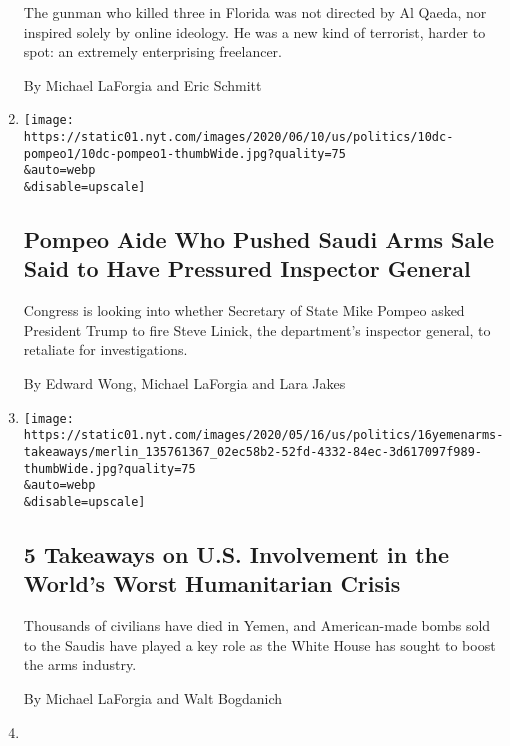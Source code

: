\begin{enumerate}
  The gunman who killed three in Florida was not directed by Al Qaeda,
  nor inspired solely by online ideology. He was a new kind of
  terrorist, harder to spot: an extremely enterprising freelancer.

  By Michael LaForgia and Eric Schmitt
\item
  \href{/2020/06/10/us/politics/pompeo-inspector-general-saudi-arms.html}{}

  \texttt{[image: https://static01.nyt.com/images/2020/06/10/us/politics/10dc-pompeo1/10dc-pompeo1-thumbWide.jpg?quality=75\\\&auto=webp\\\&disable=upscale]}

  \hypertarget{pompeo-aide-who-pushed-saudi-arms-sale-said-to-have-pressured-inspector-general}{%
  \subsection{Pompeo Aide Who Pushed Saudi Arms Sale Said to Have
  Pressured Inspector
  General}\label{pompeo-aide-who-pushed-saudi-arms-sale-said-to-have-pressured-inspector-general}}

  Congress is looking into whether Secretary of State Mike Pompeo asked
  President Trump to fire Steve Linick, the department's inspector
  general, to retaliate for investigations.

  By Edward Wong, Michael LaForgia and Lara Jakes
\item
  \href{/2020/05/16/us/arms-deals-yemen.html}{}

  \texttt{[image: https://static01.nyt.com/images/2020/05/16/us/politics/16yemenarms-takeaways/merlin\_135761367\_02ec58b2-52fd-4332-84ec-3d617097f989-thumbWide.jpg?quality=75\\\&auto=webp\\\&disable=upscale]}

  \hypertarget{5-takeaways-on-us-involvement-in-the-worlds-worst-humanitarian-crisis}{%
  \subsection{5 Takeaways on U.S. Involvement in the World's Worst
  Humanitarian
  Crisis}\label{5-takeaways-on-us-involvement-in-the-worlds-worst-humanitarian-crisis}}

  Thousands of civilians have died in Yemen, and American-made bombs
  sold to the Saudis have played a key role as the White House has
  sought to boost the arms industry.

  By Michael LaForgia and Walt Bogdanich
\item
  \href{/2020/05/16/us/arms-deals-raytheon-yemen.html}{}


\end{enumerate}
